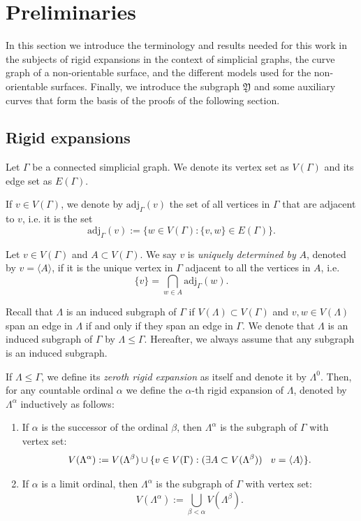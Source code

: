 \documentclass{artv3}
\newcommand*{\adj}[2]{\mathrm{adj}_{#1}(#2)}
\newcommand*{\Y}{\mathfrak{Y}}
\begin{document}
\section{Preliminaries}\label{sec:preliminaries}

In this section we introduce the terminology and results needed for this work in the subjects of rigid expansions in the context of simplicial graphs, the curve graph of a non-orientable surface, and the different models used for the non-orientable surfaces. Finally, we introduce the subgraph $\Y$ and some auxiliary curves that form the basis of the proofs of the following section.

\subsection{Rigid expansions}\label{subsec:rigidexpansions}

Let $\Gamma$ be a connected simplicial graph. We denote its vertex set as $V(\Gamma)$ and its edge set as $E(\Gamma)$.

If $v \in V(\Gamma)$, we denote by $\adj{\Gamma}{v}$ the set of all vertices in $\Gamma$ that are adjacent to $v$, i.e. it is the set $$\adj{\Gamma}{v}:= \{w \in V(\Gamma): \{v,w\} \in E(\Gamma)\}.$$

Let $v \in V(\Gamma)$ and $A \subset V(\Gamma)$. We say $v$ is \textit{uniquely determined by} $A$, denoted by $v = \langle A \rangle$, if it is the unique vertex in $\Gamma$ adjacent to all the vertices in $A$, i.e. $$\{v\} = \bigcap_{w \in A} \adj{\Gamma}{w}.$$

Recall that $\Lambda$ is an induced subgraph of $\Gamma$ if $V(\Lambda) \subset V(\Gamma)$ and $v,w \in V(\Lambda)$ span an edge in $\Lambda$ if and only if they span an edge in $\Gamma$. We denote that $\Lambda$ is an induced subgraph of $\Gamma$ by $\Lambda \leq \Gamma$. Hereafter, we always assume that any subgraph is an induced subgraph.

If $\Lambda \leq \Gamma$, we define its \textit{zeroth rigid expansion} as itself and denote it by $\Lambda^{0}$. Then, for any countable ordinal $\alpha$ we define the $\alpha$-th rigid expansion of $\Lambda$, denoted by $\Lambda^{\alpha}$ inductively as follows:
\begin{enumerate}
 \item If $\alpha$ is the successor of the ordinal $\beta$, then $\Lambda^{\alpha}$ is the subgraph of $\Gamma$ with vertex set: $$V(\Lambda^{\alpha}) := V(\Lambda^{\beta}) \cup \{v \in V(\Gamma) : (\exists A \subset V(\Lambda^{\beta})) \text{\hspace{3mm}} v = \langle A \rangle\}.$$
 \item If $\alpha$ is a limit ordinal, then $\Lambda^{\alpha}$ is the subgraph of $\Gamma$ with vertex set: $$V(\Lambda^{\alpha}) := \bigcup_{\beta < \alpha} V(\Lambda^{\beta}).$$
\end{enumerate}
\end{document}
